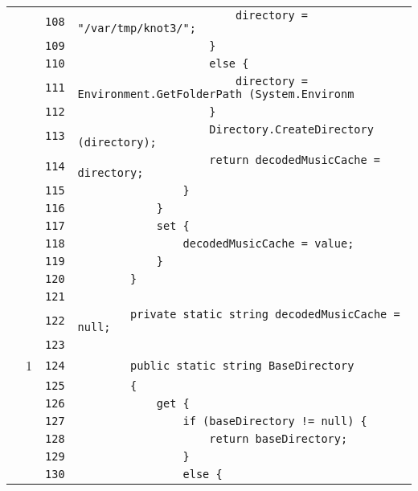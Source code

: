 \documentclass[a4paper,10pt]{article}
\begin{document}
\begin{longtable}[l]{lrrl}
\cellcolor{gray} &  & \verb~108~ & \verb~                        directory = "/var/tmp/knot3/";~\\
\cellcolor{gray} &  & \verb~109~ & \verb~                    }~\\
\cellcolor{gray} &  & \verb~110~ & \verb~                    else {~\\
\cellcolor{gray} &  & \verb~111~ & \verb~                        directory = Environment.GetFolderPath (System.Environm~\\
\cellcolor{gray} &  & \verb~112~ & \verb~                    }~\\
\cellcolor{gray} &  & \verb~113~ & \verb~                    Directory.CreateDirectory (directory);~\\
\cellcolor{gray} &  & \verb~114~ & \verb~                    return decodedMusicCache = directory;~\\
\cellcolor{gray} &  & \verb~115~ & \verb~                }~\\
\cellcolor{gray} &  & \verb~116~ & \verb~            }~\\
\cellcolor{gray} &  & \verb~117~ & \verb~            set {~\\
\cellcolor{gray} &  & \verb~118~ & \verb~                decodedMusicCache = value;~\\
\cellcolor{gray} &  & \verb~119~ & \verb~            }~\\
\cellcolor{gray} &  & \verb~120~ & \verb~        }~\\
\cellcolor{gray} &  & \verb~121~ & \verb~~\\
\cellcolor{gray} &  & \verb~122~ & \verb~        private static string decodedMusicCache = null;~\\
\cellcolor{gray} &  & \verb~123~ & \verb~~\\
\cellcolor{green} & 1 & \verb~124~ & \verb~        public static string BaseDirectory~\\
\cellcolor{gray} &  & \verb~125~ & \verb~        {~\\
\cellcolor{gray} &  & \verb~126~ & \verb~            get {~\\
\cellcolor{gray} &  & \verb~127~ & \verb~                if (baseDirectory != null) {~\\
\cellcolor{gray} &  & \verb~128~ & \verb~                    return baseDirectory;~\\
\cellcolor{gray} &  & \verb~129~ & \verb~                }~\\
\cellcolor{gray} &  & \verb~130~ & \verb~                else {~\\

\end{longtable}
\end{document}
